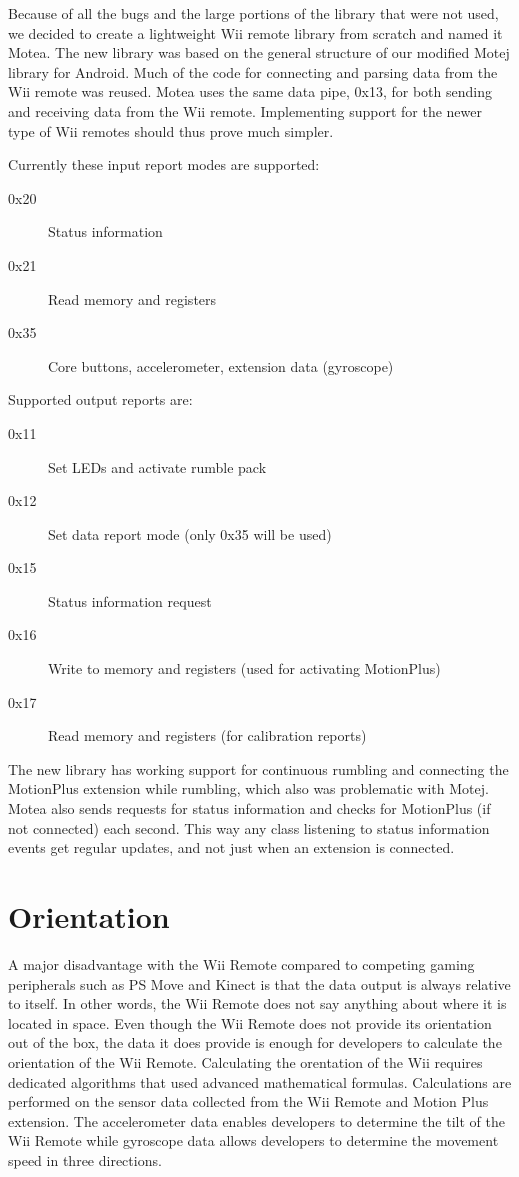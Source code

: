 Because of all the bugs and the large portions of the library that were not used, we decided to create a lightweight Wii remote library from scratch and named it Motea. The new library was based on the general structure of our modified Motej library for Android. Much of the code for connecting and parsing data from the Wii remote was reused. Motea uses the same data pipe, 0x13, for both sending and receiving data from the Wii remote. Implementing support for the newer type of Wii remotes should thus prove much simpler.

Currently these input report modes are supported:
\begin{description}
	\item[0x20] Status information
	\item[0x21] Read memory and registers
	\item[0x35] Core buttons, accelerometer, extension data (gyroscope)
\end{description}

Supported output reports are:
\begin{description}
	\item[0x11] Set LEDs and activate rumble pack
	\item[0x12] Set data report mode (only 0x35 will be used)
	\item[0x15] Status information request
	\item[0x16] Write to memory and registers (used for activating MotionPlus)
	\item[0x17] Read memory and registers (for calibration reports)
\end{description}

The new library has working support for continuous rumbling and connecting the MotionPlus extension while rumbling, which also was problematic with Motej. Motea also sends requests for status information and checks for MotionPlus (if not connected) each second. This way any class listening to status information events get regular updates, and not just when an extension is connected.

\section{Orientation}
A major disadvantage with the Wii Remote compared to competing gaming peripherals such as PS Move and Kinect is that the data output is always relative to itself. In other words, the Wii Remote does not say anything about where it is located in space. Even though the Wii Remote does not provide its orientation out of the box, the data it does provide is enough for developers to calculate the orientation of the Wii Remote. Calculating the orentation of the Wii requires dedicated algorithms that used advanced mathematical formulas. Calculations are performed on the sensor data collected from the Wii Remote and Motion Plus extension. The accelerometer data enables developers to determine the tilt of the Wii Remote while gyroscope data allows developers to determine the movement speed in three directions.

